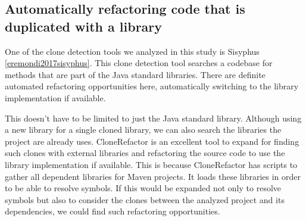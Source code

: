 \subsection{Automatically refactoring code that is duplicated with a library}
One of the clone detection tools we analyzed in this study is Sisyphus \ref{eremondi2017sisyphus}. This clone detection tool searches a codebase for methods that are part of the Java standard libraries. There are definite automated refactoring opportunities here, automatically switching to the library implementation if available.

This doesn't have to be limited to just the Java standard library. Although using a new library for a single cloned library, we can also search the libraries the project are already uses. CloneRefactor is an excellent tool to expand for finding such clones with external libraries and refactoring the source code to use the library implementation if available. This is because CloneRefactor has scripts to gather all dependent libraries for Maven projects. It loads these libraries in order to be able to resolve symbols. If this would be expanded not only to resolve symbols but also to consider the clones between the analyzed project and its dependencies, we could find such refactoring opportunities.
